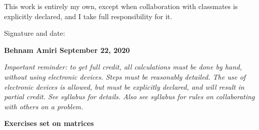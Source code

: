 \documentclass[fleqn]{article}
\begin{document}
\bigbreak

\Large This work is entirely my own, except when collaboration with classmates is explicitly declared, and I take full responsibility for it.

\bigbreak

\Large Signature and date:

\bigbreak

\bigbreak


\Large \textbf{ Behnam Amiri  September 22, 2020 }


\pagebreak

\emph{ Important reminder: to get full credit, all calculations must be done by hand, without using electronic devices. Steps must be reasonably detailed.  The use of electronic devices is allowed, but must be explicitly declared, and will result in partial credit. See syllabus for details. Also see syllabus for rules on collaborating with others on a problem. } 

\textbf{Exercises set on matrices}
\end{document}
